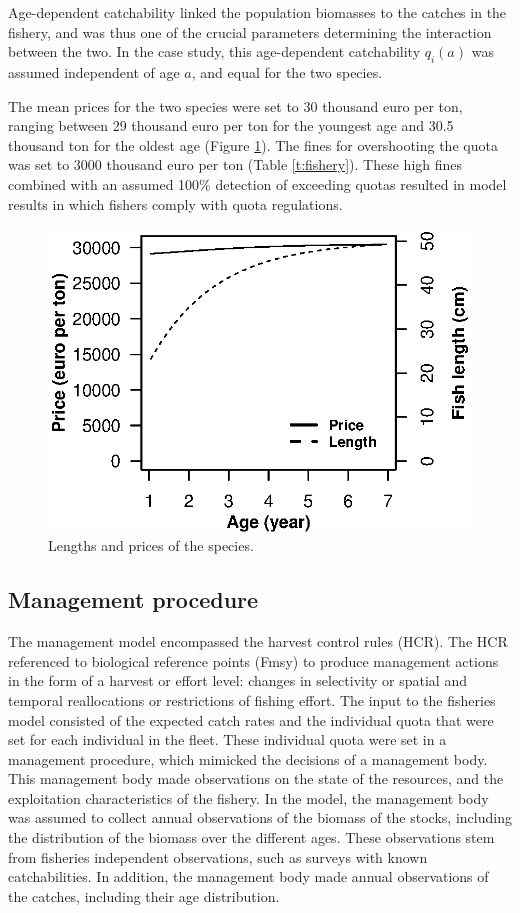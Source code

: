 \documentclass[12pt,oneline,a4paper,numbib]{ouparticle}
\numberwithin{equation}{subsection} %
\begin{document}
Age-dependent catchability linked the population biomasses to the catches in the fishery, and was thus one of the crucial parameters determining the interaction between the two. In the case study, this age-dependent catchability $q_i (a)$ was assumed independent of age $a$, and equal for the two species.

The mean prices for the two species were set to 30 thousand euro per ton, ranging between 29 thousand euro per ton for the youngest age and 30.5 thousand ton for the oldest age (Figure \ref{f:prices}). The fines for overshooting the quota was set  to 3000 thousand euro per ton (Table \ref{t:fishery}). These high fines combined with an assumed 100\% detection of exceeding quotas resulted in model results in which fishers comply with quota regulations.

\begin{figure}[!ht]
\centering
\includegraphics[width=.5\textwidth]{Figures/Prices.eps} 
\caption{Lengths and prices of the species.}
\label{f:prices}
\end{figure}

\subsection{Management procedure}

The management model encompassed the harvest control rules (HCR). The HCR referenced to biological reference points (Fmsy) to produce management actions in the form of a harvest or effort level: changes in selectivity or spatial and temporal reallocations or restrictions of fishing effort. The input to the fisheries model consisted of the expected catch rates and the individual quota that were set for each individual in the fleet. These individual quota were set in a management procedure, which mimicked the decisions of a management body. This management body made observations on the state of the resources, and the exploitation characteristics of the fishery. In the model, the management body was assumed to collect annual observations of the biomass of the stocks, including the distribution of the biomass over the different ages. These observations stem from fisheries independent observations, such as surveys with known catchabilities. In addition, the management body made annual observations of the catches, including their age distribution. 
\end{document}
